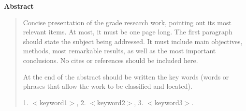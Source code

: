 \thispagestyle{empty}
\begin{center}
\begin{LARGE}
\textbf{Abstract}
\end{LARGE}
\end{center}

\begin{quotation}
Concise presentation of the grade research work, pointing out its most relevant items. At most, it must be one page long. The first paragraph should state the subject being addressed. It must include main objectives, methods, most remarkable results, as well as the most important conclusions. No cites or references should be included here.

At the end of the abstract should be written the key words (words or phrases that allow the work to be classified and located).
\vspace*{0.5cm}

 1. $<$keyword1$>$, 2. $<$keyword2$>$, 3. $<$keyword3$>$.

\end{quotation}
